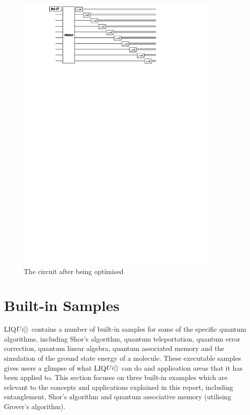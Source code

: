 \documentclass[12pt]{third-rep}
\begin{document}
\begin{figure}[ht]
\centering
\includegraphics[width=10cm]{circuit2}
\caption{The circuit after being optimised}
\end{figure}

\newpage
\section{Built-in Samples}
LIQ$Ui{\left\vert{}\right\rangle}$ contains a number of built-in samples for some of the specific quantum algorithms, including Shor’s algorithm, quantum teleportation, quantum error correction, quantum linear algebra, quantum associated memory and the simulation of the ground state energy of a molecule. These executable samples gives users a glimpse of what LIQ$Ui{\left\vert{}\right\rangle}$ can do and application areas that it has been applied to. This section focuses on three built-in examples which are relevant to the concepts and applications explained in this report, including entanglement, Shor’s algorithm and quantum associative memory (utilising Grover’s algorithm).
\end{document}
